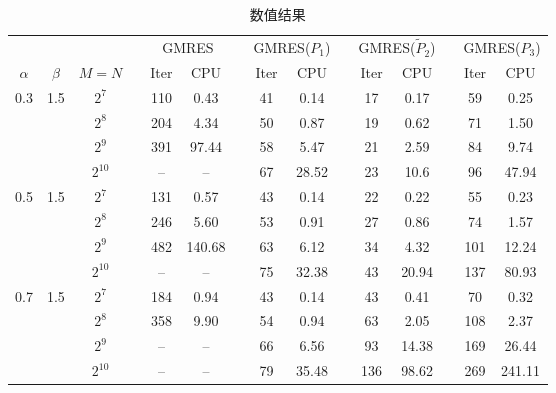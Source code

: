 \documentclass{ecnumaster}
\begin{document}
\clearpage
\begin{table}[H]
\centering
\caption{数值结果} \label{tab4-3-2}
\begin{tabular}{ccccccccccccccc} \toprule
& &  && \multicolumn{2}{c}{GMRES} && \multicolumn{2}{c}{GMRES($P_1$)}
&& \multicolumn{2}{c}{GMRES($\tilde{P}_2$)}
&& \multicolumn{2}{c}{GMRES($P_3$)} \\
$\alpha$ & $\beta$ & $M = N$ && Iter & CPU && Iter & CPU
&& Iter & CPU && Iter & CPU \\ \midrule
0.3 & 1.5
 & $2^7$    && 110 & 0.43   && 41 &0.14   && 17 & 0.17  && 59 & 0.25    \\
&& $2^8$    && 204 & 4.34   && 50 &0.87   && 19 & 0.62  && 71 & 1.50    \\
&& $2^9$    && 391 & 97.44  && 58 &5.47   && 21 & 2.59  && 84 & 9.74    \\
&& $2^{10}$ && --  & --     && 67 &28.52  && 23 & 10.6  && 96 & 47.94   \\  \midrule
0.5 & 1.5
 & $2^7$    && 131 & 0.57   && 43 &0.14   && 22 & 0.22  && 55 & 0.23     \\
&& $2^8$    && 246 & 5.60   && 53 &0.91   && 27 & 0.86  && 74 & 1.57     \\
&& $2^9$    && 482 & 140.68 && 63 &6.12   && 34 & 4.32  && 101 & 12.24   \\
&& $2^{10}$ && --  & --     && 75 &32.38  && 43 & 20.94 && 137 & 80.93   \\ \midrule
0.7 & 1.5
 & $2^7$    && 184 & 0.94   && 43 &0.14   && 43 & 0.41  && 70 & 0.32     \\
&& $2^8$    && 358 & 9.90   && 54 &0.94   && 63 & 2.05  && 108 & 2.37    \\
&& $2^9$    && --  & --     && 66 &6.56   && 93 & 14.38 && 169 & 26.44   \\
&& $2^{10}$ && --  & --     && 79 &35.48  && 136& 98.62 && 269 & 241.11  \\ \bottomrule
\end{tabular}
\end{table}
\end{document}
